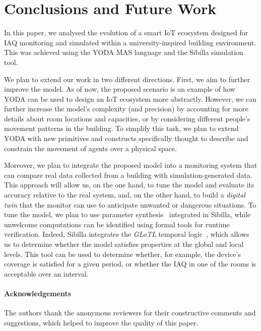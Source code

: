 \documentclass[runningheads]{llncs}
\newcommand{\yoda}{\textsf{YODA}}
\newcommand{\sibilla}{\textsf{Sibilla}}
\begin{document}
\section{Conclusions and Future Work}\label{sec:conc}

In this paper, we analysed the evolution of a smart IoT ecosystem designed for IAQ monitoring and simulated within a university-inspired building environment. This was achieved using the \yoda{} MAS language and the \sibilla{} simulation tool.

We plan to extend our work in two different directions. First, we aim to further improve the model. As of now, the proposed scenario is an example of how \yoda{} can be used to design an IoT ecosystem more abstractly.
%
However, we can further increase the model's complexity (and precision) by accounting for more details about room locations and capacities, or by considering different people's movement patterns in the building. 
%
To simplify this task, we plan to extend \yoda{} with new primitives and constructs specifically thought to describe and constrain the movement of agents over a physical space. 

Moreover, we plan to integrate the proposed model into a monitoring system that can compare real data collected from a building with simulation-generated data. 
%
This approach will allow us, on the one hand, to tune the model and evaluate its accuracy relative to the real system, and, on the other hand, to build a \emph{digital twin} that the monitor can use to anticipate unwanted or dangerous situations.
%
To tune the model, we plan to use parameter synthesis~\cite{MatteucciQL24} integrated in \sibilla{}, while unwelcome computations can be identified using formal tools for runtime verification.
%
Indeed, \sibilla{} integrates the \emph{GLoTL} temporal logic~\cite{glotl}, which allows us to determine whether the model satisfies properties at the global and local levels.
%
This tool can be used to determine whether, for example, the device's coverage is satisfied for a given period, or whether the IAQ in one of the rooms is acceptable over an interval.


\paragraph*{Acknowledgements} The authors thank the anonymous reviewers for their constructive comments and suggestions, which helped to improve the quality of this paper.

%


%
\end{document}
